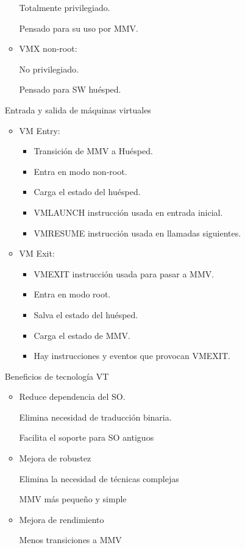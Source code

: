 \documentclass[12pt, twoside, openright]{report} %
\begin{document}
\begin{itemize}
\begin{itemize}
		            Totalmente privilegiado.

		            Pensado para su uso por MMV.
		      \item VMX non-root:

		            No privilegiado.

		            Pensado para SW huésped.
	      \end{itemize}

	      Entrada y salida de máquinas virtuales
	      \begin{itemize}
		      \item VM Entry:
		            \begin{itemize}
			            \item Transición de MMV a Huésped.
			            \item Entra en modo non-root.
			            \item Carga el estado del huésped.
			            \item VMLAUNCH instrucción usada en entrada inicial.
			            \item VMRESUME instrucción usada en llamadas siguientes.
		            \end{itemize}
		      \item VM Exit:
		            \begin{itemize}
			            \item VMEXIT instrucción usada para pasar a MMV.
			            \item Entra en modo root.
			            \item Salva el estado del huésped.
			            \item Carga el estado de MMV.
			            \item Hay instrucciones y eventos que provocan VMEXIT.
		            \end{itemize}

	      \end{itemize}
	      \pagebreak
	      Beneficios de tecnología VT
	      \begin{itemize}
		      \item Reduce dependencia del SO.

		            Elimina necesidad de traducción binaria.

		            Facilita el soporte para SO antiguos
		      \item Mejora de robustez

		            Elimina la necesidad de técnicas complejas

		            MMV más pequeño y simple
		      \item Mejora de rendimiento

		            Menos transiciones a MMV
	      \end{itemize}


\end{itemize}
\end{document}
